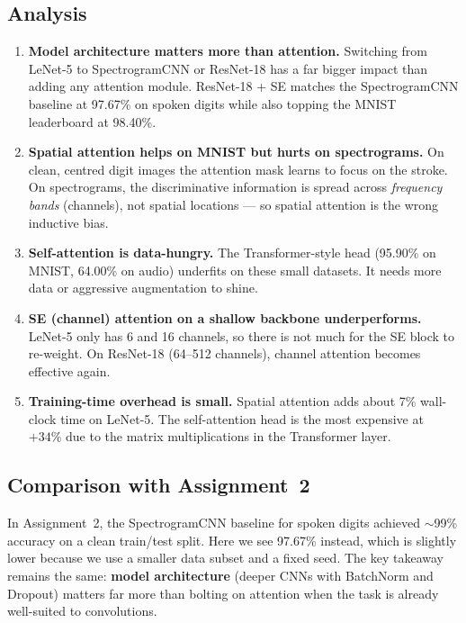 \documentclass[12pt, a4paper]{article}
\begin{document}
\subsection{Analysis}

\begin{enumerate}
    \item \textbf{Model architecture matters more than attention.}
          Switching from LeNet-5 to SpectrogramCNN or ResNet-18 has a far bigger
          impact than adding any attention module.  ResNet-18 + SE matches the
          SpectrogramCNN baseline at 97.67\% on spoken digits while also topping
          the MNIST leaderboard at 98.40\%.

    \item \textbf{Spatial attention helps on MNIST but hurts on spectrograms.}
          On clean, centred digit images the attention mask learns to focus on
          the stroke.  On spectrograms, the discriminative information is spread
          across \emph{frequency bands} (channels), not spatial locations ---
          so spatial attention is the wrong inductive bias.

    \item \textbf{Self-attention is data-hungry.}
          The Transformer-style head (95.90\% on MNIST, 64.00\% on audio)
          underfits on these small datasets.  It needs more data or aggressive
          augmentation to shine.

    \item \textbf{SE (channel) attention on a shallow backbone underperforms.}
          LeNet-5 only has 6 and 16 channels, so there is not much for the
          SE block to re-weight.  On ResNet-18 (64--512 channels), channel
          attention becomes effective again.

    \item \textbf{Training-time overhead is small.}
          Spatial attention adds about 7\% wall-clock time on LeNet-5.
          The self-attention head is the most expensive at $+34\%$ due to the
          matrix multiplications in the Transformer layer.
\end{enumerate}

\subsection{Comparison with Assignment~2}

In Assignment~2, the SpectrogramCNN baseline for spoken digits achieved
$\sim$99\% accuracy on a clean train/test split.  Here we see 97.67\% instead,
which is slightly lower because we use a smaller data subset and a fixed seed.
The key takeaway remains the same: \textbf{model architecture} (deeper CNNs with
BatchNorm and Dropout) matters far more than bolting on attention when the task
is already well-suited to convolutions.
\end{document}
